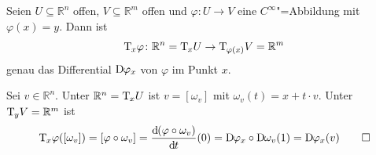 \begin{lemma}[{name=[Die Tangentialabbildung ist eine Verallgemeinerung des Differentials]},label=lem:bekanntes-diff]
	Seien $U \subseteq \mathbb{R}^n$ offen, $V \subseteq \mathbb{R}^m$ offen und $\varphi \colon U \to V$ eine $C^\infty$"=Abbildung mit $\varphi(x)=y$. Dann ist
	\[
		\mathrm{T}\mkern-0.85mu_x \varphi \colon \mathbb{R}^n= \mathrm{T}\mkern-0.85mu_x U \to \mathrm{T}\mkern-0.85mu_{\varphi(x)} V = \mathbb{R}^m
	\] 
	genau das Differential $\mathrm{D}\mkern-1.0mu \varphi_x$ von $\varphi$ im Punkt $x$.
\end{lemma}
\begin{beweis}
	Sei $v \in \mathbb{R}^n$. 
	Unter $\mathbb{R}^n = \mathrm{T}\mkern-0.85mu_x U$ ist $v=[\omega_v]$ mit $\omega_v(t) = x + t \cdot v$. 
	Unter $\mathrm{T}\mkern-0.85mu_y V =\mathbb{R}^m$ ist
	\[
		\Tang_x \varphi \enbrace*{[\omega_v]} = [\varphi \circ \omega_v] = \diffd{(\varphi \circ \omega_v)}{t}(0) = \D \varphi_x \circ \D \omega_v (1)=\D \varphi_x(v) \qedhere
	\]
\end{beweis}

